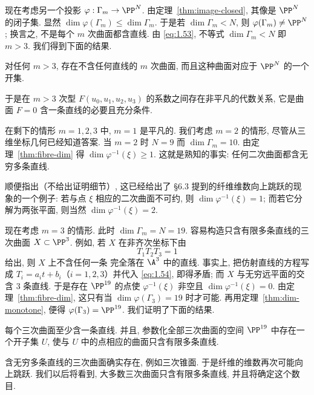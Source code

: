 现在考虑另一个投影 $\varphi: \Gamma_m \to \PP^N$. 由定理~\ref{thm:image-closed}, 其像是 $\PP^N$ 的闭子集. 显然 $\dim \varphi(\Gamma_m) \le \dim \Gamma_m$. 于是若 $\dim \Gamma_m < N$, 则 $\varphi(\Gamma_m) \ne \PP^N$; 换言之, 不是每个 $m$ 次曲面都含直线. 由 \eqref{eq:1.53}, 不等式 $\dim \Gamma_m < N$ 即 $m > 3$. 我们得到下面的结果.

\begin{theorem}\label{thm:surfaces-no-lines}
	对任何 $m > 3$, 存在不含任何直线的 $m$ 次曲面, 而且这种曲面对应于 $\PP^N$ 的一个开集.
\end{theorem}

于是在 $m > 3$ 次型 $F(u_0, u_1, u_2, u_3)$ 的系数之间存在非平凡的代数关系, 它是曲面 $F = 0$ 含一条直线的必要且充分条件.

在剩下的情形 $m = 1, 2, 3$ 中, $m = 1$ 是平凡的. 我们考虑 $m = 2$ 的情形, 尽管从三维坐标几何已经知道答案. 当 $m = 2$ 时 $N = 9$ 而 $\dim \Gamma_m = 10$. 由定理~\ref{thm:fibre-dim} 得 $\dim \varphi^{-1}(\xi) \ge 1$. 这就是熟知的事实: 任何二次曲面都含无穷多条直线.

顺便指出（不给出证明细节）, 这已经给出了 §6.3 提到的纤维维数向上跳跃的现象的一个例子: 若与点 $\xi$ 相应的二次曲面不可约, 则 $\dim \varphi^{-1}(\xi) = 1$; 而若它分解为两张平面, 则当然 $\dim \varphi^{-1}(\xi) = 2$.

现在考虑 $m = 3$ 的情形. 此时 $\dim \Gamma_m = N = 19$. 容易构造只含有限多条直线的三次曲面 $X \subset \PP^3$. 例如, 若 $X$ 在非齐次坐标下由
\begin{equation}
	\label{eq:1.54}
	T_1 T_2 T_3 = 1
\end{equation}
给出, 则 $X$ 上不含任何一条 完全落在 $\A^3$ 中的直线. 事实上, 把仿射直线的方程写成 $T_i = a_i t + b_i$（$i = 1, 2, 3$）并代入 \eqref{eq:1.54}, 即得矛盾; 而 $X$ 与无穷远平面的交含 $3$ 条直线. 于是存在 $\PP^{19}$ 的点使 $\varphi^{-1}(\xi)$ 非空且 $\dim \varphi^{-1}(\xi) = 0$. 由定理~\ref{thm:fibre-dim}, 这只有当 $\dim \varphi(\Gamma_3) = 19$ 时才可能. 再用定理~\ref{thm:dim-monotone}, 便得 $\varphi(\Gamma_3) = \PP^{19}$. 我们证明了下面的结果.

\begin{theorem}\label{thm:cubic-lines}
	每个三次曲面至少含一条直线. 并且, 参数化全部三次曲面的空间 $\PP^{19}$ 中存在一个开子集 $U$, 使与 $U$ 中的点相应的曲面只含有限多条直线.
\end{theorem}

含无穷多条直线的三次曲面确实存在, 例如三次锥面. 于是纤维的维数再次可能向上跳跃. 我们以后将看到, 大多数三次曲面只含有限多条直线, 并且将确定这个数目.

